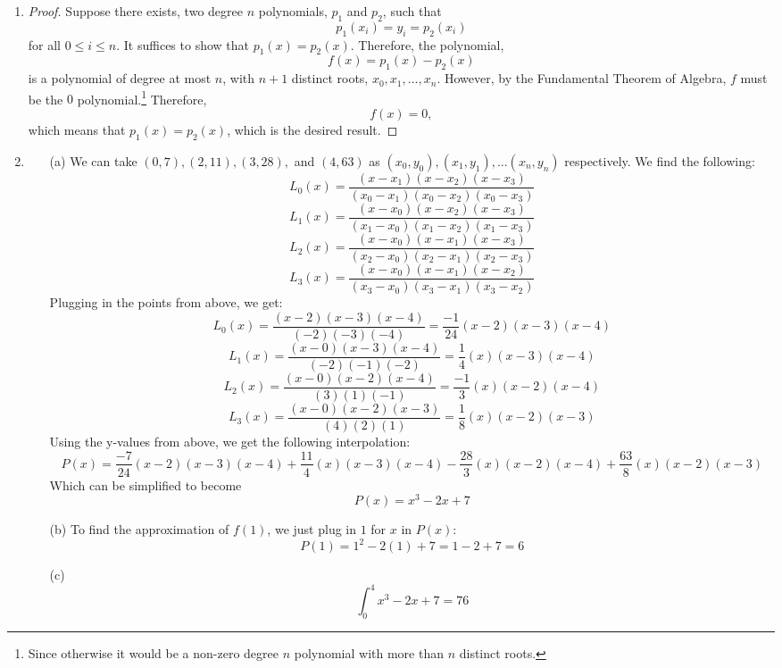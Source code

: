 \documentclass[12pt]{article}
\begin{document}
\begin{enumerate}[leftmargin=2em]
    \item 
    \begin{proof}
        Suppose there exists, two degree $n$ polynomials, $p_1$ and $p_2$, such that
        \[p_{1}(x_i)=y_i=p_{2}(x_i)\]
        for all $0\leq i\leq n$. It suffices to show that $p_1(x)=p_2(x)$. Therefore, the polynomial, 
        \[f(x)=p_{1}(x)-p_{2}(x)\]
        is a polynomial of degree at most $n$, with $n+1$ distinct roots, $x_0,x_1,\ldots,x_n$. However, by the Fundamental Theorem of Algebra, $f$ must be the $0$ polynomial.\footnote{Since otherwise it would be a non-zero degree $n$ polynomial with more than $n$ distinct roots.}
        Therefore, \[f(x)=0,\] which means that $p_1(x)=p_2(x)$, which is the desired result.
    \end{proof}
    \item
    \begin{enumerate}
        \item[(a)] We can take $(0,7), (2, 11), (3, 28),$ and $(4,63)$ as $(x_0, y_0), (x_1, y_1), ... (x_n, y_n)$ respectively. We find the following:
        \[L_0(x) = \frac{(x-x_{1})(x-x_{2})(x-x_{3})}{(x_{0}-x_{1})(x_{0}-x_{2})(x_{0}-x_{3})}\]
        \[L_1(x) = \frac{(x-x_{0})(x-x_{2})(x-x_{3})}{(x_{1}-x_{0})(x_{1}-x_{2})(x_{1}-x_{3})}\]
        \[L_2(x) = \frac{(x-x_{0})(x-x_{1})(x-x_{3})}{(x_{2}-x_{0})(x_{2}-x_{1})(x_{2}-x_{3})}\]
        \[L_3(x) = \frac{(x-x_{0})(x-x_{1})(x-x_{2})}{(x_{3}-x_{0})(x_{3}-x_{1})(x_{3}-x_{2})}\]
        Plugging in the points from above, we get:
        \[L_0(x) = \frac{(x-2)(x-3)(x-4)}{(-2)(-3)(-4)} = \frac{-1}{24}(x-2)(x-3)(x-4)\]
        \[L_1(x) = \frac{(x-0)(x-3)(x-4)}{(-2)(-1)(-2)} = \frac{1}{4}(x)(x-3)(x-4)\]
        \[L_2(x) = \frac{(x-0)(x-2)(x-4)}{(3)(1)(-1)} = \frac{-1}{3}(x)(x-2)(x-4)\]
        \[L_3(x) = \frac{(x-0)(x-2)(x-3)}{(4)(2)(1)} = \frac{1}{8}(x)(x-2)(x-3)\]
        Using the y-values from above, we get the following interpolation:
        \[P(x)=\frac{-7}{24}(x-2)(x-3)(x-4) 
        + \frac{11}{4}(x)(x-3)(x-4)-\frac{28}{3}(x)(x-2)(x-4)
        +\frac{63}{8}(x)(x-2)(x-3)\]
        Which can be simplified to become 
        \[P(x) = x^3-2x+7\]
        \item[(b)]        
        To find the approximation of $f(1)$, we just plug in $1$ for $x$ in $P(x)$:
        \[P(1)=1^2-2(1)+7 = 1 - 2 + 7 = 6\]
        \item[(c)]
        \[\int_{0}^{4}x^3-2x+7 = 76\]
    \end{enumerate}


\end{enumerate}
\end{document}
